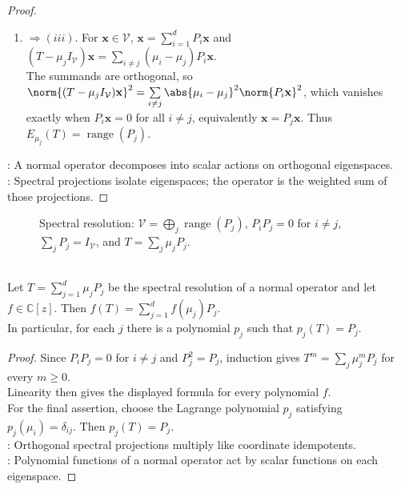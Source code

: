 \begin{theorem}
\begin{proof}
\begin{enumerate}[label=(\roman*).]
Because $\sum_jP_j=I_{\mathcal{V}}$, at least one $P_k\mathbf{x}$ is nonzero, so $\mu_k=\lambda$. Thus $\operatorname{spec}(T)\subseteq\{\mu_1,\ldots,\mu_d\}$.
\item[$(ii)$] $\Rightarrow (iii)$. For $\mathbf{x}\in\mathcal{V}$, $\mathbf{x} =\sum\limits_{i=1}^{d}P_i\mathbf{x}$ and $(T-\mu_jI_{\mathcal{V}})\mathbf{x} =\sum\limits_{i\neq j}(\mu_i-\mu_j)P_i\mathbf{x}$.\\
The summands are orthogonal, so $\norm{(T-\mu_jI_{\mathcal{V}})\mathbf{x}}^2 =\sum\limits_{i\neq j}\abs{\mu_i-\mu_j}^2\norm{P_i\mathbf{x}}^2$,
which vanishes exactly when $P_i\mathbf{x}=0$ for all $i\neq j$, equivalently $\mathbf{x}=P_j\mathbf{x}$. Thus $E_{\mu_j}(T)=\operatorname{range}(P_j)$.
\end{enumerate}
: A normal operator decomposes into scalar actions on orthogonal eigenspaces.\\
: Spectral projections isolate eigenspaces; the operator is the weighted sum of those projections.
\end{proof}
\end{theorem}

\begin{figure}[H]
  \centering
  
  \caption{Spectral resolution: $\mathcal{V}=\bigoplus_j\operatorname{range}(P_j)$, $P_iP_j=0$ for $i\neq j$, $\sum_jP_j=I_{\mathcal{V}}$, and $T=\sum_j\mu_jP_j$.}
  \label{fig:spectral-resolution-projectors}
\end{figure}

\begin{corollary} \label{cor:normal-spectral-resolution-functional-calculus} \\
Let $T=\sum_{j=1}^{d}\mu_jP_j$ be the spectral resolution of a normal operator and let $f\in\mathbb{C}[z]$. Then $f(T)=\sum\limits_{j=1}^{d}f(\mu_j)P_j$.\\
In particular, for each $j$ there is a polynomial $p_j$ such that $p_j(T)=P_j$.
\begin{proof}
Since $P_iP_j=0$ for $i\neq j$ and $P_j^2=P_j$, induction gives $T^m=\sum_j\mu_j^mP_j$ for every $m\geq0$.\\
Linearity then gives the displayed formula for every polynomial $f$.\\
For the final assertion, choose the Lagrange polynomial $p_j$ satisfying $p_j(\mu_i)=\delta_{ij}$. Then $p_j(T)=P_j$.\\
: Orthogonal spectral projections multiply like coordinate idempotents.\\
: Polynomial functions of a normal operator act by scalar functions on each eigenspace.
\end{proof}
\end{corollary}


